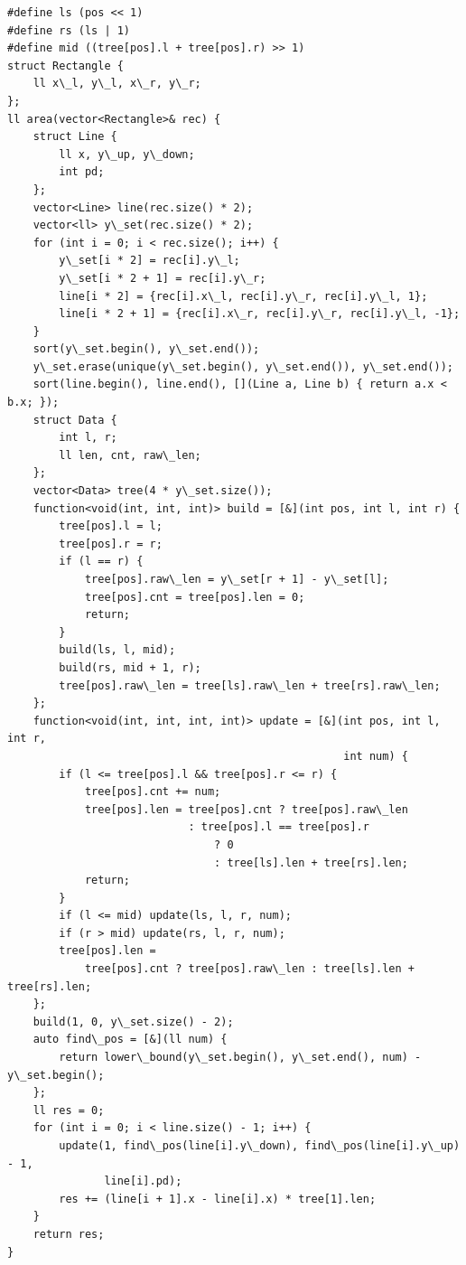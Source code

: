 \documentclass[UTF8]{ctexart}
\begin{document}
\begin{sloppypar}
\begin{lstlisting}[style=cpp]
#define ls (pos << 1)
#define rs (ls | 1)
#define mid ((tree[pos].l + tree[pos].r) >> 1)
struct Rectangle {
    ll x\_l, y\_l, x\_r, y\_r;
};
ll area(vector<Rectangle>& rec) {
    struct Line {
        ll x, y\_up, y\_down;
        int pd;
    };
    vector<Line> line(rec.size() * 2);
    vector<ll> y\_set(rec.size() * 2);
    for (int i = 0; i < rec.size(); i++) {
        y\_set[i * 2] = rec[i].y\_l;
        y\_set[i * 2 + 1] = rec[i].y\_r;
        line[i * 2] = {rec[i].x\_l, rec[i].y\_r, rec[i].y\_l, 1};
        line[i * 2 + 1] = {rec[i].x\_r, rec[i].y\_r, rec[i].y\_l, -1};
    }
    sort(y\_set.begin(), y\_set.end());
    y\_set.erase(unique(y\_set.begin(), y\_set.end()), y\_set.end());
    sort(line.begin(), line.end(), [](Line a, Line b) { return a.x < b.x; });
    struct Data {
        int l, r;
        ll len, cnt, raw\_len;
    };
    vector<Data> tree(4 * y\_set.size());
    function<void(int, int, int)> build = [&](int pos, int l, int r) {
        tree[pos].l = l;
        tree[pos].r = r;
        if (l == r) {
            tree[pos].raw\_len = y\_set[r + 1] - y\_set[l];
            tree[pos].cnt = tree[pos].len = 0;
            return;
        }
        build(ls, l, mid);
        build(rs, mid + 1, r);
        tree[pos].raw\_len = tree[ls].raw\_len + tree[rs].raw\_len;
    };
    function<void(int, int, int, int)> update = [&](int pos, int l, int r,
                                                    int num) {
        if (l <= tree[pos].l && tree[pos].r <= r) {
            tree[pos].cnt += num;
            tree[pos].len = tree[pos].cnt ? tree[pos].raw\_len
                            : tree[pos].l == tree[pos].r
                                ? 0
                                : tree[ls].len + tree[rs].len;
            return;
        }
        if (l <= mid) update(ls, l, r, num);
        if (r > mid) update(rs, l, r, num);
        tree[pos].len =
            tree[pos].cnt ? tree[pos].raw\_len : tree[ls].len + tree[rs].len;
    };
    build(1, 0, y\_set.size() - 2);
    auto find\_pos = [&](ll num) {
        return lower\_bound(y\_set.begin(), y\_set.end(), num) - y\_set.begin();
    };
    ll res = 0;
    for (int i = 0; i < line.size() - 1; i++) {
        update(1, find\_pos(line[i].y\_down), find\_pos(line[i].y\_up) - 1,
               line[i].pd);
        res += (line[i + 1].x - line[i].x) * tree[1].len;
    }
    return res;
}
\end{lstlisting}

\clearpage


\end{sloppypar}
\end{document}
